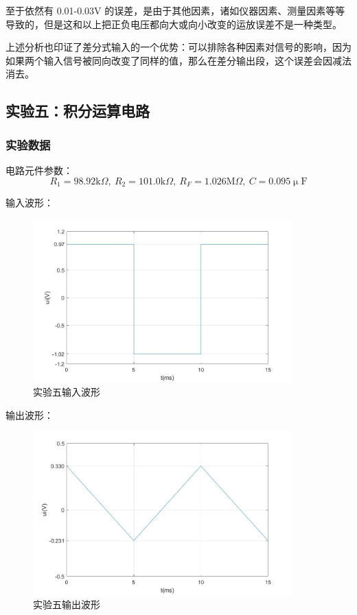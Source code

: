 \documentclass[a4paper,11pt,UTF8]{ctexart}
\newcommand\mr[1]{\mathrm{#1}}
\begin{document}
\par 至于依然有 0.01-0.03V 的误差，是由于其他因素，诸如仪器因素、测量因素等等导致的，但是这和以上把正负电压都向大或向小改变的运放误差不是一种类型。
\par 上述分析也印证了差分式输入的一个优势：可以排除各种因素对信号的影响，因为如果两个输入信号被同向改变了同样的值，那么在差分输出段，这个误差会因减法消去。

\subsection{实验五：积分运算电路}
\subsubsection{实验数据}
电路元件参数：
\[ R_1=98.92\mr{k}\Omega,~R_2=101.0\mr{k}\Omega,~R_F=1.026\mr{M}\Omega,~C=0.095\mr{\upmu F} \]
\par 输入波形：
\begin{figure}[H]
 \centering
 \includegraphics[width=10cm]{Exp05In}
 \caption{实验五输入波形}
 \label{fig:Exp05In}
\end{figure}
输出波形：
\begin{figure}[H]
 \centering
 \includegraphics[width=10cm]{Exp05Out}
 \caption{实验五输出波形}
 \label{fig:Exp05Out}
\end{figure}
\end{document}

